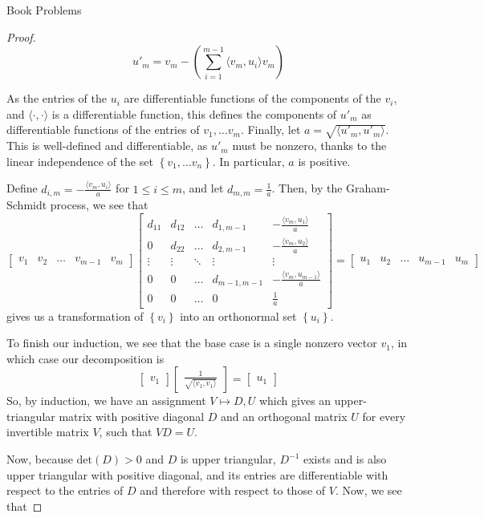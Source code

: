 \documentclass[12pt]{article}
\theoremstyle{definition}
\begin{document}
\begin{section}{Book Problems}
\begin{proof}
\[ u'_m = v_m - \left( \sum_{i = 1}^{m-1} \langle v_m, u_i\rangle v_m \right)\]
\par As the entries of the $u_i$ are differentiable functions of the components of the $v_i$, and $\langle \cdot, \cdot\rangle$ is a differentiable function, this defines the components of $u'_m$ as differentiable functions of the entries of $v_1, \dots v_m$. Finally, let $a = \sqrt{\langle u'_m, u'_m\rangle}$. This is well-defined and differentiable, as $u'_m$ must be nonzero, thanks to the linear independence of the set $\left\{ v_1, \dots v_n \right\}$. In particular, $a$ is positive.
\par Define $d_{i,m} = -\frac{\langle v_m, u_i\rangle}{a} $ for $1 \leq i \leq m$, and  let $d_{m,m} = \frac{1}{a}$. Then, by the Graham-Schmidt process, we see that 
\[ \begin{bmatrix}
		v_1 & v_2 & \dots & v_{m-1} & v_m
\end{bmatrix}
\begin{bmatrix}
	d_{11} & d_{12} & \dots & d_{1, m-1} & -\frac{\langle v_m, u_1\rangle}{a}\\
	0 & d_{22} & \dots & d_{2, m-1} &-\frac{\langle v_m, u_2\rangle}{a} \\
	\vdots & \vdots & \ddots & \vdots & \vdots \\
	0 & 0 & \dots & d_{m-1, m-1} & -\frac{\langle v_m, u_{m-1}\rangle}{a}\\
	0 & 0 & \dots & 0 & \frac{1}{a}
\end{bmatrix} = \begin{bmatrix}
	u_1 &  u_2 & \dots & u_{m-1} & u_{m}
\end{bmatrix}\]
gives us a transformation of $\left\{ v_i \right\}$ into an orthonormal set $\left\{ u_i \right\}$.
\par To finish our induction, we see that the base case is a single nonzero vector $v_1$, in which case our decomposition is 
\[\begin{bmatrix}
	v_1
\end{bmatrix} \begin{bmatrix}
	\frac{1}{\sqrt{\langle v_1, v_1\rangle}}
\end{bmatrix} = \begin{bmatrix}
u_1
\end{bmatrix}\]
So, by induction, we have an assignment $V \mapsto D, U$ which gives an upper-triangular matrix with positive diagonal $D$ and an orthogonal matrix $U$ for every invertible matrix $V$, such that $VD = U$.
\par Now, because $\text{det}(D) > 0$ and $D$ is upper triangular, $D^{-1}$ exists and is also upper triangular with positive diagonal, and its entries are differentiable with respect to the entries of $D$ and therefore with respect to those of $V$. Now, we see that 

\end{proof}
\end{section}
\end{document}
